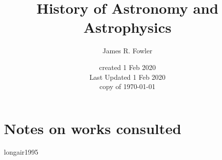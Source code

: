 \documentclass[letterpaper]{article}
\begin{document}
\title{History of Astronomy and Astrophysics}
\author{James R. Fowler}
\date{created 1 Feb 2020\\ Last Updated 1 Feb 2020\\ copy of \today}
\maketitle

\tableofcontents

\section{Notes on works consulted}

{longair1995}

\printbibliography
\end{document}
